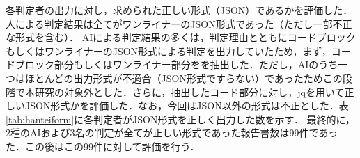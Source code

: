 各判定者の出力に対し，求められた正しい形式（JSON）であるかを評価した．人による判定結果は全てがワンライナーのJSON形式であった（ただし一部不正な形式を含む）．
AIによる判定結果の多くは，判定理由とともにコードブロックもしくはワンライナーのJSON形式による判定を出力していたため，まず，コードブロック部分もしくはワンライナー部分をを抽出した．ただし，AIのうち一つはほとんどの出力形式が不適合（JSON形式ですらない）であったためこの段階で本研究の対象外とした．さらに，抽出したコード部分に対し，jq\cite{jq}を用いて正しいJSON形式かを評価した．なお，今回はJSON以外の形式は不正とした．表\ref{tab:hanteiform}に各判定者がJSON形式を正しく出力した数を示す．
最終的に，2種のAIおよび3名の判定が全てが正しい形式であった報告書数は99件であった．この後はこの99件に対して評価を行う．
